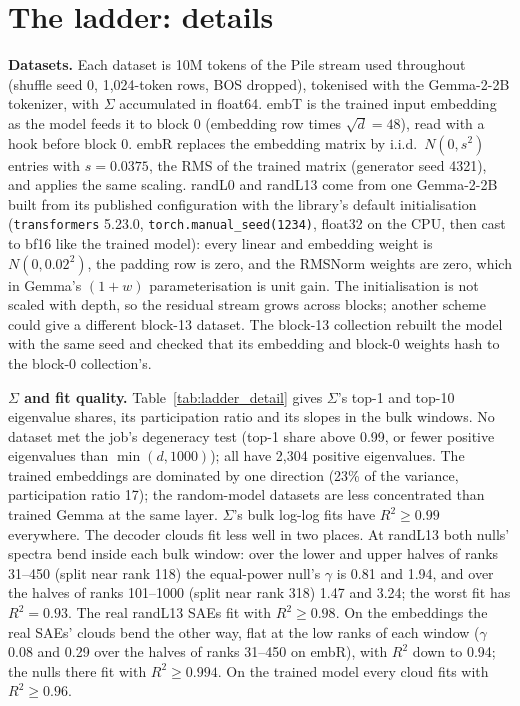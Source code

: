 \documentclass[10pt,twocolumn]{article}
\newcommand{\Sig}{\Sigma}
\begin{document}
\section{The ladder: details}
\label{app:ladder}

\textbf{Datasets.} Each dataset is 10M tokens of the Pile stream used throughout (shuffle seed 0, 1,024-token rows, BOS dropped), tokenised with the Gemma-2-2B tokenizer, with $\Sig$ accumulated in float64. embT is the trained input embedding as the model feeds it to block 0 (embedding row times $\sqrt{d}=48$), read with a hook before block 0. embR replaces the embedding matrix by i.i.d.\ $N(0,s^2)$ entries with $s=0.0375$, the RMS of the trained matrix (generator seed 4321), and applies the same scaling. randL0 and randL13 come from one Gemma-2-2B built from its published configuration with the library's default initialisation (\texttt{transformers} 5.23.0, \texttt{torch.manual\_seed(1234)}, float32 on the CPU, then cast to bf16 like the trained model): every linear and embedding weight is $N(0, 0.02^2)$, the padding row is zero, and the RMSNorm weights are zero, which in Gemma's $(1+w)$ parameterisation is unit gain. The initialisation is not scaled with depth, so the residual stream grows across blocks; another scheme could give a different block-13 dataset. The block-13 collection rebuilt the model with the same seed and checked that its embedding and block-0 weights hash to the block-0 collection's.

\textbf{$\Sig$ and fit quality.} Table~\ref{tab:ladder_detail} gives $\Sig$'s top-1 and top-10 eigenvalue shares, its participation ratio and its slopes in the bulk windows. No dataset met the job's degeneracy test (top-1 share above 0.99, or fewer positive eigenvalues than $\min(d,1000)$); all have 2,304 positive eigenvalues. The trained embeddings are dominated by one direction (23\% of the variance, participation ratio 17); the random-model datasets are less concentrated than trained Gemma at the same layer. $\Sig$'s bulk log-log fits have $R^2\ge 0.99$ everywhere. The decoder clouds fit less well in two places. At randL13 both nulls' spectra bend inside each bulk window: over the lower and upper halves of ranks 31--450 (split near rank 118) the equal-power null's $\gamma$ is 0.81 and 1.94, and over the halves of ranks 101--1000 (split near rank 318) 1.47 and 3.24; the worst fit has $R^2=0.93$. The real randL13 SAEs fit with $R^2\ge 0.98$. On the embeddings the real SAEs' clouds bend the other way, flat at the low ranks of each window ($\gamma$ 0.08 and 0.29 over the halves of ranks 31--450 on embR), with $R^2$ down to 0.94; the nulls there fit with $R^2\ge 0.994$. On the trained model every cloud fits with $R^2\ge 0.96$.
\end{document}
